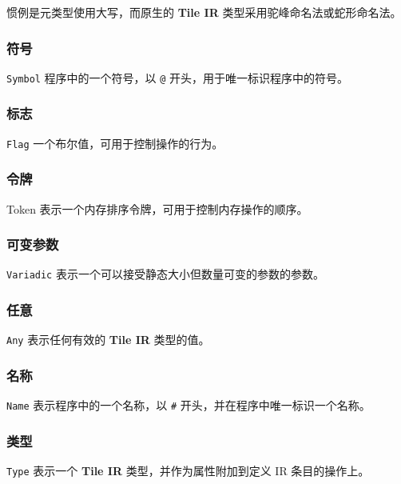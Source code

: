 \documentclass{article}
\begin{document}
惯例是元类型使用大写，而原生的 \textbf{Tile IR} 类型采用驼峰命名法或蛇形命名法。


\subsubsection{符号}

\texttt{Symbol} 程序中的一个符号，以 \texttt{@} 开头，用于唯一标识程序中的符号。



\subsubsection{标志}

\texttt{Flag} 一个布尔值，可用于控制操作的行为。



\subsubsection{令牌}

Token 表示一个内存排序令牌，可用于控制内存操作的顺序。



\subsubsection{可变参数}

\texttt{Variadic} 表示一个可以接受静态大小但数量可变的参数的参数。



\subsubsection{任意}

\texttt{Any} 表示任何有效的 \textbf{Tile IR} 类型的值。



\subsubsection{名称}

\texttt{Name} 表示程序中的一个名称，以 \texttt{\#} 开头，并在程序中唯一标识一个名称。



\subsubsection{类型}

\texttt{Type} 表示一个 \textbf{Tile IR} 类型，并作为属性附加到定义 IR 条目的操作上。
\end{document}
